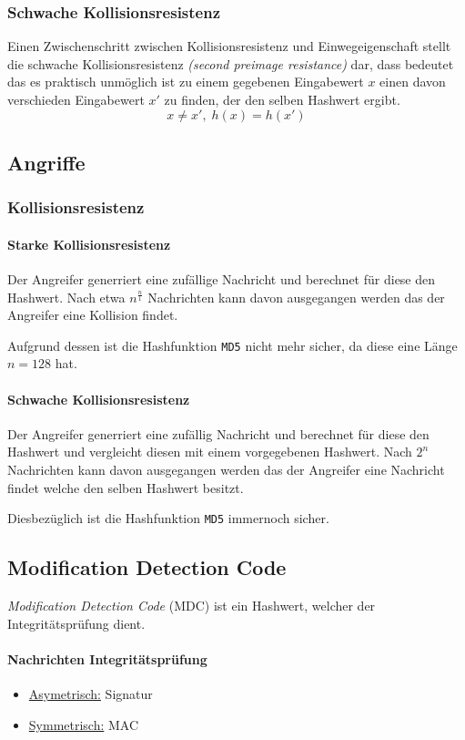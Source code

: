 \documentclass[a4paper,landscape]{article}
\begin{document}
\begin{multicols*}{4}
	\subsubsection{Schwache Kollisionsresistenz}
	Einen Zwischenschritt zwischen Kollisionsresistenz und Einwegeigenschaft
	stellt die schwache Kollisionsresistenz \emph{(second preimage resistance)}
	dar, dass bedeutet das es praktisch unmöglich ist zu einem gegebenen
	Eingabewert \(x\) einen davon verschieden Eingabewert \(x'\) zu finden, der
	den selben Hashwert ergibt. \[x \neq x',\; h(x) = h(x')\]

	\subsection{Angriffe}
	\subsubsection*{Kollisionsresistenz}
	\paragraph{Starke Kollisionsresistenz}
	Der Angreifer generriert eine zufällige Nachricht und berechnet für diese
	den Hashwert. Nach etwa \(n^{\frac{n}{1}}\) Nachrichten kann davon
	ausgegangen werden das der Angreifer eine Kollision findet. \par
	Aufgrund dessen ist die Hashfunktion \texttt{MD5} nicht mehr sicher, da
	diese eine Länge \(n = 128\) hat.
	\paragraph{Schwache Kollisionsresistenz}
	Der Angreifer generriert eine zufällig Nachricht und berechnet für diese
	den Hashwert und vergleicht diesen mit einem vorgegebenen Hashwert. Nach
	\(2^{n}\) Nachrichten kann davon ausgegangen werden das der Angreifer eine
	Nachricht findet welche den selben Hashwert besitzt. \par
	Diesbezüglich ist die Hashfunktion \texttt{MD5} immernoch sicher.

	\subsection{Modification Detection Code}
	\emph{Modification Detection Code} (MDC) ist ein Hashwert, welcher der
	Integritätsprüfung dient.
	\paragraph{Nachrichten Integritätsprüfung}
	\begin{itemize}[nolistsep]
		\item \underline{Asymetrisch:} Signatur
		\item \underline{Symmetrisch:} MAC
	\end{itemize}


\end{multicols*}
\end{document}
